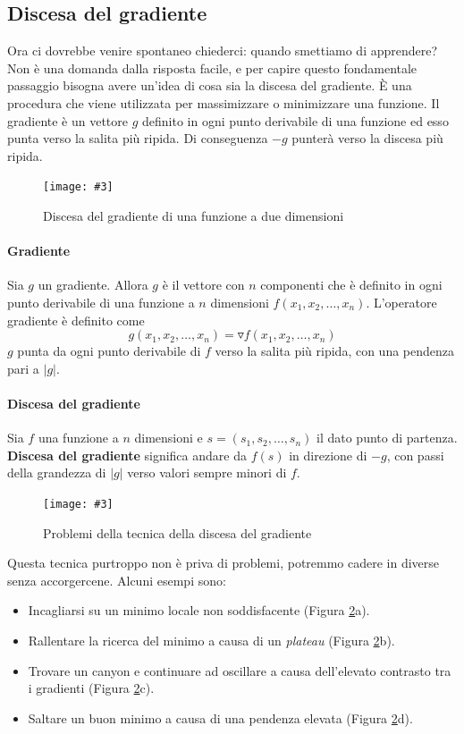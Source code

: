 \documentclass[12pt, twoside, letterpaper]{report}
\newcommand{\img}[4] {
	\begin{figure}
		\caption{#1}
		\centering
		\texttt{[image: \#3]}\\
		\label{#4}
	\end{figure}
}
\begin{document}
			
			\subsection{Discesa del gradiente}
				Ora ci dovrebbe venire spontaneo chiederci: quando smettiamo di apprendere? Non è una domanda dalla risposta facile, e per capire questo fondamentale passaggio bisogna avere un'idea di cosa sia la discesa del gradiente. È una procedura che viene utilizzata per massimizzare o minimizzare una funzione. Il gradiente è un vettore $g$ definito in ogni punto derivabile di una funzione ed esso punta verso la salita più ripida. Di conseguenza $-g$ punterà verso la discesa più ripida.
				\img{Discesa del gradiente di una funzione a due dimensioni}{0.5}{gradient_descent_2d.png}{gradient_descent}

				\paragraph{Gradiente} Sia $g$ un gradiente. Allora $g$ è il vettore con $n$ componenti che è definito in ogni punto derivabile di una funzione a $n$ dimensioni $f(x_1, x_2, \dots, x_n)$. L'operatore gradiente è definito come $$g(x_1, x_2, \dots, x_n) = \triangledown f(x_1, x_2, \dots, x_n)$$
					$g$ punta da ogni punto derivabile di $f$ verso la salita più ripida, con una pendenza pari a $|g|$. \cite{kriesel}
				
				\paragraph{Discesa del gradiente} Sia $f$ una funzione a $n$ dimensioni e $s=(s_1, s_2, \dots, s_n)$ il dato punto di partenza. \textbf{Discesa del gradiente} significa andare da $f(s)$ in direzione di $-g$, con passi della grandezza di $|g|$ verso valori sempre minori di $f$. \cite{kriesel}
				
				\img{Problemi della tecnica della discesa del gradiente}{0.4}{gradient_descent.png}{gradient_descent}
				
				Questa tecnica purtroppo non è priva di problemi, potremmo cadere in diverse  senza accorgercene. Alcuni esempi sono: 
				\begin{itemize}
				 	\item Incagliarsi su un minimo locale non soddisfacente (Figura \ref{gradient_descent}a).
				 	\item Rallentare la ricerca del minimo a causa di un \textit{plateau} (Figura \ref{gradient_descent}b).
				 	\item Trovare un canyon  e continuare ad oscillare a causa dell'elevato contrasto tra i gradienti (Figura \ref{gradient_descent}c).
				 	\item Saltare un buon minimo a causa di una pendenza elevata (Figura \ref{gradient_descent}d).
				 \end{itemize} 
				 
\end{document}
